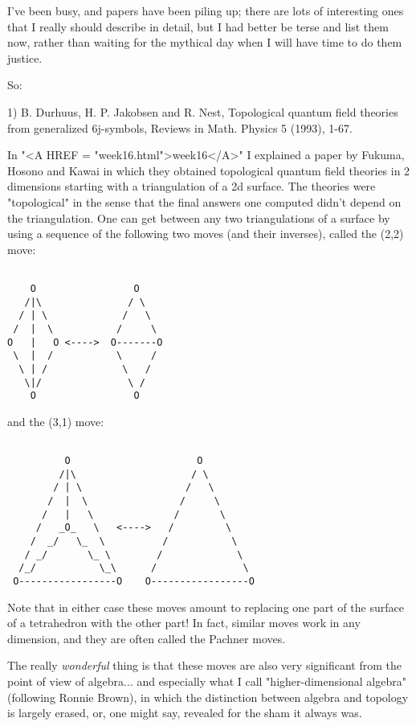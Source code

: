 


I've been busy, and papers have been piling up; there are lots of
interesting ones that I really should describe in detail, but I
had better be terse and list them now, rather than waiting for the
mythical day when I will have time to do them justice.  

So:

1) B. Durhuus, H. P. Jakobsen and R. Nest, 
Topological quantum field theories from generalized
6j-symbols, Reviews in Math.
Physics 5 (1993), 1-67. 

In "<A HREF = "week16.html">week16</A>" I explained a paper by Fukuma, Hosono and Kawai in which
they obtained topological quantum field theories in 2 dimensions
starting with a triangulation of a 2d surface.  The theories were
"topological" in the sense that the final answers one computed didn't
depend on the triangulation.  One can get between any two triangulations
of a surface by using a sequence of the following two moves (and their
inverses), called the (2,2) move:


\begin{verbatim}

    O                 O
   /|\               / \
  / | \             /   \
 /  |  \           /     \
O   |   O <---->  O-------O
 \  |  /           \     /
  \ | /             \   /
   \|/               \ /
    O                 O
\end{verbatim}
    

and the (3,1) move:



\begin{verbatim}

          O                      O
         /|\                    / \
        / | \                  /   \
       /  |  \                /     \
      /   |   \              /       \
     /   _O_   \   <---->   /         \
    /  _/   \_  \          /           \
   / _/       \_ \        /             \
  /_/           \_\      /               \
 O-----------------O    O-----------------O
\end{verbatim}
    

Note that in either case these moves amount to replacing one part of the
surface of a tetrahedron with the other part!  In fact, similar moves
work in any dimension, and they are often called the Pachner moves.

The really \emph{wonderful} 
thing is that these moves are also very significant
from the point of view of algebra... and especially what I call
"higher-dimensional algebra" (following Ronnie Brown), in which the
distinction between algebra and topology is largely erased, or, one
might say, revealed for the sham it always was.

